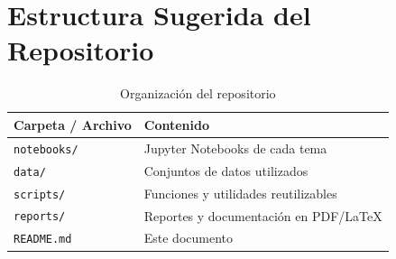 \documentclass[12pt, a4paper]{article}
\begin{document}
\section{Estructura Sugerida del Repositorio}

\begin{table}[H]
  \centering
  \caption{Organización del repositorio}
  \label{tab:estructura}
  \begin{tabular}{ll}
    \toprule
    \textbf{Carpeta / Archivo} & \textbf{Contenido} \\
    \midrule
    \texttt{notebooks/}        & Jupyter Notebooks de cada tema \\
    \texttt{data/}             & Conjuntos de datos utilizados \\
    \texttt{scripts/}          & Funciones y utilidades reutilizables \\
    \texttt{reports/}          & Reportes y documentación en PDF/LaTeX \\
    \texttt{README.md}         & Este documento \\
    \bottomrule
  \end{tabular}
\end{table}
\end{document}
